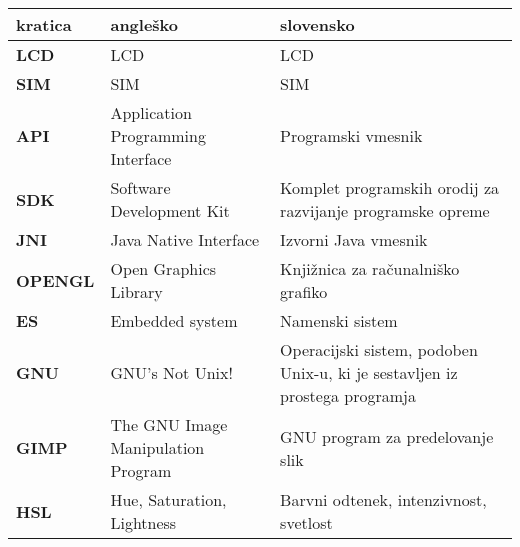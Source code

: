 \begin{tabular}{l|p{5cm}|p{6cm}}
  {\bf kratica} & {\bf angleško} & {\bf slovensko} \\ \hline
  {\bf LCD} & LCD & LCD \\
  {\bf SIM} & SIM & SIM \\
  {\bf API} & Application Programming Interface & Programski vmesnik \\
  {\bf SDK} & Software Development Kit & Komplet programskih orodij za razvijanje programske opreme \\
  {\bf JNI} & Java Native Interface & Izvorni Java vmesnik \\
  {\bf OPENGL} & Open Graphics Library & Knjižnica za računalniško grafiko \\
  {\bf ES} & Embedded system & Namenski sistem \\
  {\bf GNU} & GNU's Not Unix! & Operacijski sistem, podoben Unix-u, ki je sestavljen iz prostega programja \\
  {\bf GIMP} & The GNU Image Manipulation Program & GNU program za predelovanje slik \\
  {\bf HSL} & Hue, Saturation, Lightness & Barvni odtenek, intenzivnost, svetlost
\end{tabular}
